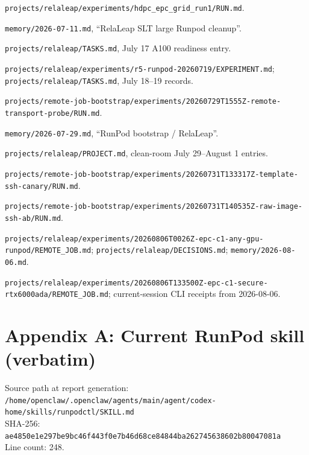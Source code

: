 \documentclass[10pt]{article}
\begin{document}
\begin{description}[style=nextline,leftmargin=1.2em]
\item[S1] \texttt{projects/relaleap/experiments/hdpc\_epc\_grid\_run1/RUN.md}.
\item[S2] \texttt{memory/2026-07-11.md}, ``RelaLeap SLT large Runpod cleanup''.
\item[S3] \texttt{projects/relaleap/TASKS.md}, July 17 A100 readiness entry.
\item[S4] \texttt{projects/relaleap/experiments/r5-runpod-20260719/EXPERIMENT.md};
\texttt{projects/relaleap/TASKS.md}, July 18--19 records.
\item[S5] \texttt{projects/remote-job-bootstrap/experiments/20260729T1555Z-remote-transport-probe/RUN.md}.
\item[S6] \texttt{memory/2026-07-29.md}, ``RunPod bootstrap / RelaLeap''.
\item[S7] \texttt{projects/relaleap/PROJECT.md}, clean-room July 29--August 1 entries.
\item[S8] \texttt{projects/remote-job-bootstrap/experiments/20260731T133317Z-template-ssh-canary/RUN.md}.
\item[S9] \texttt{projects/remote-job-bootstrap/experiments/20260731T140535Z-raw-image-ssh-ab/RUN.md}.
\item[S10] \texttt{projects/relaleap/experiments/20260806T0026Z-epc-c1-any-gpu-runpod/REMOTE\_JOB.md};
\texttt{projects/relaleap/DECISIONS.md}; \texttt{memory/2026-08-06.md}.
\item[S11] \texttt{projects/relaleap/experiments/20260806T133500Z-epc-c1-secure-rtx6000ada/REMOTE\_JOB.md};
current-session CLI receipts from 2026-08-06.
\end{description}

\clearpage
\appendix
\section*{Appendix A: Current RunPod skill (verbatim)}

Source path at report generation:\\
\texttt{/home/openclaw/.openclaw/agents/main/agent/codex-home/skills/runpodctl/SKILL.md}\\
SHA-256: \texttt{ae4850e1e297be9bc46f443f0e7b46d68ce84844ba262745638602b80047081a}\\
Line count: 248.


\end{document}
